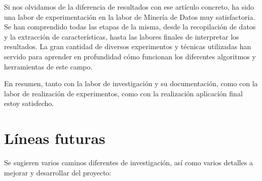 Si nos olvidamos de la diferencia de resultados con ese artículo concreto, ha sido una labor de experimentación en la labor de Minería de Datos muy satisfactoria. Se han comprendido todas las etapas de la misma, desde la recopilación de datos y la extracción de características, hasta las labores finales de interpretar los resultados. La gran cantidad de diversos experimentos y técnicas utilizadas han servido para aprender en profundidad cómo funcionan los diferentes algoritmos y herramientas de este campo.

En resumen, tanto con la labor de investigación y su documentación, como con la labor de realización de experimentos, como con la realización aplicación final estoy satisfecho.



\section{Líneas futuras}
Se sugieren varios caminos diferentes de investigación, así como varios detalles a mejorar y desarrollar del proyecto:
